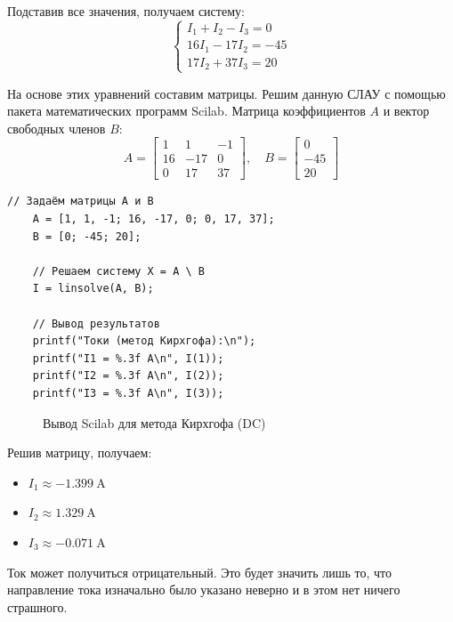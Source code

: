 \documentclass[14pt, a4paper]{styles/gost-7-32} %
\begin{document}
Подставив все значения, получаем систему:
\begin{equation}
    \begin{cases}
        I_1 + I_2 - I_3 = 0 \\
        16 I_1 - 17 I_2 = -45 \\
        17 I_2 + 37 I_3 = 20
    \end{cases}
    \label{eq:system_kirchhoff1}
\end{equation}

На основе этих уравнений составим матрицы. Решим данную СЛАУ с помощью пакета математических программ Scilab.
Матрица коэффициентов $A$ и вектор свободных членов $B$:
\begin{equation*}
    A = \begin{bmatrix}
        1 & 1 & -1 \\
        16 & -17 & 0 \\
        0 & 17 & 37
    \end{bmatrix}, \quad
    B = \begin{bmatrix}
        0 \\ -45 \\ 20
    \end{bmatrix}
\end{equation*}

\begin{lstlisting}[caption=Решение СЛАУ методом Кирхгофа (Scilab), label=lst:scilab_kirchhoff1]
    // Задаём матрицы A и B
    A = [1, 1, -1; 16, -17, 0; 0, 17, 37];
    B = [0; -45; 20];
    
    // Решаем систему X = A \ B
    I = linsolve(A, B);
    
    // Вывод результатов
    printf("Токи (метод Кирхгофа):\n");
    printf("I1 = %.3f А\n", I(1));
    printf("I2 = %.3f А\n", I(2));
    printf("I3 = %.3f А\n", I(3));
    \end{lstlisting}
    
    \begin{figure}[H]
      \centering
      \caption{Вывод Scilab для метода Кирхгофа (DC)}
      \label{fig:scilab_kirchhoff1_out}
    \end{figure}

Решив матрицу, получаем:
\begin{itemize}
    \item $I_1 \approx \SI{-1.399}{\ampere}$
    \item $I_2 \approx \SI{1.329}{\ampere}$
    \item $I_3 \approx \SI{-0.071}{\ampere}$
\end{itemize}
Ток может получиться отрицательный. Это будет значить лишь то, что направление тока изначально было указано неверно и в этом нет ничего страшного.
\end{document}
